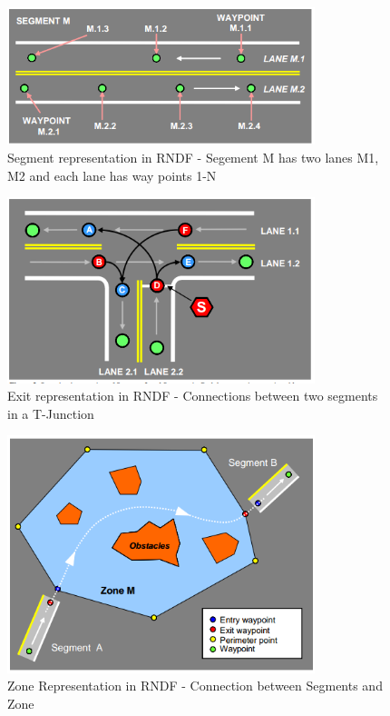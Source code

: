 \begin{figure}
    \centering
    \includegraphics[width=0.8\textwidth]{Images/rndf_segment.png}
    \caption{Segment representation in RNDF - Segement M has two lanes M1, M2 and each lane has way points 1-N}
    \label{rndf_segment}
\end{figure}

\begin{figure}
    \centering
    \includegraphics[width=0.8\textwidth]{Images/rndf_exits.png}
    \caption{Exit representation in RNDF - Connections between two segments in a T-Junction}
    \label{rndf_exits}
\end{figure}

\begin{figure}
    \centering
    \includegraphics[width=0.8\textwidth]{Images/zone_segment.png}
    \caption{Zone Representation in RNDF - Connection between Segments and Zone}
    \label{zone_segment}
\end{figure}


